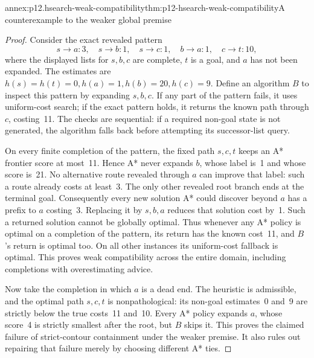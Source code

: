 \begin{annexitem}{annex:p12.hsearch-weak-compatibility}{thm:p12-hsearch-weak-compatibility}{A counterexample to the weaker global premise}
\begin{proof}
Consider the exact revealed pattern
\[
 s\to a:3,\quad s\to b:1,\quad s\to c:1,\quad
 b\to a:1,\quad c\to t:10,
\]
where the displayed lists for \(s,b,c\) are complete, \(t\) is a
goal, and \(a\) has not been expanded. The estimates are
\(h(s)=h(t)=0,h(a)=1,h(b)=20,h(c)=9\). Define an algorithm
\(B\) to inspect this pattern by expanding \(s,b,c\). If any
part of the pattern fails, it uses uniform-cost search; if the exact
pattern holds, it returns the known path through \(c\), costing~11.
The checks are sequential: if a required non-goal state is not generated,
the algorithm falls back before attempting its successor-list query.

On every finite completion of the pattern, the fixed path \(s,c,t\)
keeps an A* frontier score at most~11. Hence A* never expands \(b\),
whose label is~1 and whose score is~21. No alternative route revealed
through \(a\) can improve that label: such a route already costs at
least~3. The only other revealed root branch ends at the terminal goal.
Consequently every new solution A* could discover beyond \(a\)
has a prefix to \(a\) costing~3. Replacing it by \(s,b,a\)
reduces that solution cost by~1. Such a returned solution cannot be
globally optimal. Thus whenever any A* policy is optimal on a completion
of the pattern, its return has the known cost~11, and \(B\)'s return
is optimal too. On all other instances its uniform-cost fallback is
optimal. This proves weak compatibility across the entire domain,
including completions with overestimating advice.

Now take the completion in which \(a\) is a dead end. The heuristic
is admissible, and the optimal path \(s,c,t\) is nonpathological:
its non-goal estimates~0 and~9 are strictly below the true costs~11 and~10.
Every A* policy expands \(a\), whose score~4 is strictly smallest
after the root, but \(B\) skips it. This proves the claimed failure
of strict-contour containment under the weaker premise. It also rules
out repairing that failure merely by choosing different A* ties.
\end{proof}
\end{annexitem}

